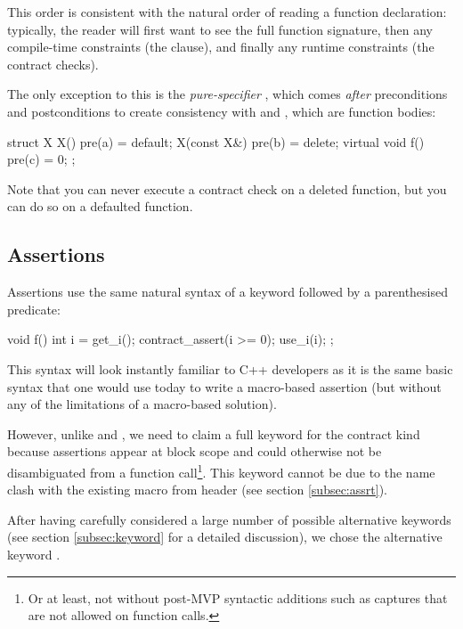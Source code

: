 This order is consistent with the natural order of reading a function declaration: typically, the reader will first want to see the full function signature, then any compile-time constraints (the  clause), and finally any runtime constraints (the contract checks).

The only exception to this is the \emph{pure-specifier} , which comes \emph{after} preconditions and postconditions to create consistency with  and , which are function bodies: 

\begin{codeblock}
struct X {
  X()              pre(a) = default;
  X(const X&)      pre(b) = delete;
  virtual void f() pre(c) = 0; 
};
\end{codeblock}

Note that you can never execute a contract check on a deleted function, but you can do so on a defaulted function.


\subsection{Assertions}
\label{subsec:assertions}

Assertions use the same natural syntax of a keyword followed by a parenthesised predicate:

\begin{codeblock}
void f() {
  int i = get_i();
  contract_assert(i >= 0); 
  use_i(i);
};
\end{codeblock}

This syntax will look instantly familiar to C++ developers as it is the same basic syntax that one would use today to write a macro-based assertion (but without any of the limitations of a macro-based solution).

However, unlike  and , we need to claim a full keyword for the contract kind because assertions appear at block scope and could otherwise not be disambiguated from a function call\footnote{Or at least, not without post-MVP syntactic additions such as captures that are not allowed on function calls.}. This keyword cannot be  due to the name clash with the existing  macro from header  (see section \ref{subsec:assrt}).

After having carefully considered a large number of possible alternative keywords (see section \ref{subsec:keyword} for a detailed discussion), we chose the alternative keyword .

